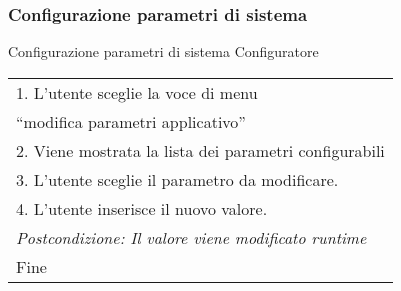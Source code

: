 \begin{minipage}{\textwidth}
    \subsubsection{Configurazione parametri di sistema}
    \usecase
        {Configurazione parametri di sistema}
        {
            Configuratore
        }
        {
            \begin{tabular}{l}
                1. L'utente sceglie la voce di menu \\ ``modifica parametri applicativo''\\
                2. Viene mostrata la lista dei parametri configurabili\\
                3. L'utente sceglie il parametro da modificare.\\
                4. L'utente inserisce il nuovo valore.\\
                \textit{Postcondizione: Il valore viene modificato runtime}\\
                Fine
            \end{tabular}\\

        }
        \vspace{0.5cm}
\end{minipage}